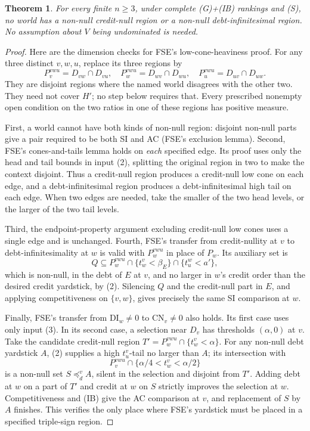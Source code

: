 \documentclass[11pt]{article}
\newtheorem{theorem}{Theorem}
\theoremstyle{remark}\newtheorem{remark}[theorem]{Remark}
\begin{document}
\begin{theorem}\label{thm:LH}
For every finite $n\ge3$, under complete (G)+(IB) rankings and (S),
no world has a
non-null credit-null region or a non-null debt-infinitesimal region.
No assumption about $V$ being undominated is needed.
\end{theorem}
\begin{proof}
Here are the dimension checks for FSE's low-cone-heaviness proof.
For any three distinct $v,w,u$, replace its three regions by
\[
 P_v^{vwu}=D_{vw}\cap D_{vu},\quad
 P_w^{vwu}=D_{wv}\cap D_{wu},\quad
 P_u^{vwu}=D_{uv}\cap D_{uw}.
\]
They are disjoint regions where the named world disagrees with the
other two. They need not cover $H'$; no step below requires that.
Every prescribed nonempty open condition on the two ratios in one of
these regions has positive measure.

First, a world cannot have both kinds of non-null region: disjoint
non-null parts give a pair required to be both SI and AC (FSE's exclusion
lemma). Second, FSE's cones-and-tails lemma holds on \emph{each}
specified edge. Its proof uses only the head and tail bounds in input
(2), splitting the original region in two to make the context disjoint.
Thus a credit-null region produces a credit-null low cone on each edge,
and a debt-infinitesimal region produces a debt-infinitesimal high tail
on each edge. When two edges are needed, take the smaller of the two
head levels, or the larger of the two tail levels.

Third, the endpoint-property argument excluding credit-null low cones
uses a single edge and is unchanged. Fourth, FSE's transfer from
credit-nullity at $v$ to debt-infinitesimality at $w$ is valid with
$P_w^{vwu}$ in place of $P_w$. Its auxiliary set is
\[
 Q\subseteq P_w^{vwu}\cap\{t^v_w<\beta_E\}
                   \cap\{t^w_u<a'\},
\]
which is non-null, in the debt of $E$ at $v$, and no larger in $w$'s
credit order than the desired credit yardstick, by (2). Silencing
$Q$ and the credit-null part in $E$, and applying competitiveness on
$\{v,w\}$, gives precisely the same SI comparison at $w$.

Finally, FSE's transfer from $\mathrm{DI}_w\ne0$ to
$\mathrm{CN}_v\ne0$ also holds. Its first case uses only input (3).
In its second case, a selection near $D_v$ has thresholds
$(\alpha,0)$ at $v$. Take the candidate credit-null region
$T'=P_w^{vwu}\cap\{t^v_w<\alpha\}$.
For any non-null debt yardstick $A$, (2) supplies a high $t^v_u$-tail
no larger than $A$; its intersection with
\[
 P_v^{vwu}\cap\{\alpha/4<t^v_w<\alpha/2\}
\]
is a non-null set $S\preceq^v_d A$, silent in the selection and
disjoint from $T'$. Adding debt at $w$ on a part of $T'$ and credit at
$w$ on $S$ strictly improves the selection at $w$. Competitiveness
and (IB) give the AC comparison at $v$, and replacement of $S$ by $A$
finishes. This verifies the only place where FSE's yardstick must be
placed in a specified triple-sign region.


\end{proof}
\end{document}
